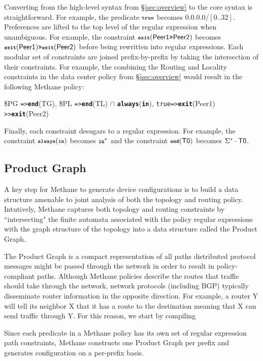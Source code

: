 \documentclass{sig-alternate-10pt}
\newcommand{\sysname}{{\small \sf Methane}\xspace}
\newcommand{\CD}[1]{\texttt{\small #1}}  %
\newcommand{\KW}[1]{\texttt{\small\bfseries{#1}}}
\newcommand{\True}{\CD{true}}
\newcommand{\Prefer}{\texttt{>>}}
\newcommand{\Path}{\texttt{=>}}
\newcommand{\In}{\KW{in}}
\newcommand{\Exit}{\KW{exit}}
\newcommand{\End}{\KW{end}}
\newcommand{\Always}{\KW{always}}
\begin{document}
Converting from the high-level syntax from \S\ref{sec:overview} to the core syntax is straightforward. For example, the predicate $\True$ becomes $0.0.0.0/[0..32]$. Preferences are lifted to the top level of the regular expression when unambiguous. For example, the constraint $\Exit(\sf{Peer1} \Prefer \sf{Peer2})$ becomes $\Exit(\sf{Peer1}) \Prefer \Exit(\sf{Peer2})$ before being rewritten into regular expressions. Each modular set of constraints are joined prefix-by-prefix by taking the intersection of their constraints. For example, the combining the Routing and Locality constraints in the data center policy from \S\ref{sec:overview} would result in the following \sysname policy:
%
\begin{code}
\$PG  \Path \End(TG),
\$PL  \Path \End(TL) \ensuremath{\cap} \Always(\In),
\True \Path \Exit(Peer1) \Prefer \Exit(Peer2)
\end{code}
\noindent%
%
Finally, each constraint desugars to a regular expression. For example, the constraint $\Always(\In)$ becomes $\In^*$ and the constraint $\End({\small \mathsf{T0}})$ becomes $\Sigma^* \cdot \sf{T0}$.

\subsection{Product Graph}

A key step for \sysname to generate device configurations is to build a data structure amenable to joint analysis of both the topology and routing policy. Intutively, \sysname captures both topology and routing constraints by ``intersecting" the finite automata associated with the policy regular expressions with the graph structure of the topology into a data structure called the Product Graph. 

The Product Graph is a compact representation of all paths distributed protocol messages might be passed through the network in order to result in policy-compliant paths.
Although \sysname policies describe the routes that traffic should take through the network, network protocols (including BGP) typically disseminate router information in the opposite direction. 
For example, a router Y will tell its neighbor X that it has a route to the destination meaning that X can send traffic through Y. For this reason, we start by compiling 

Since each predicate in a \sysname policy has its own set of regular expression path constraints, \sysname constructs one Product Graph per prefix and generates configuration on a per-prefix basis.
\end{document}
